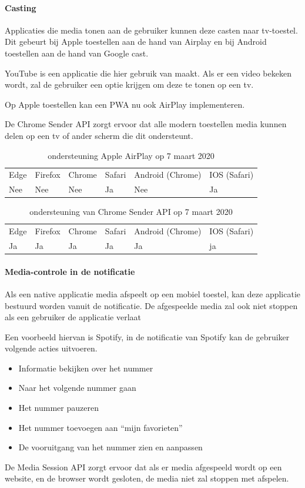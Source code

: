 \paragraph{Casting}

Applicaties die media tonen aan de gebruiker kunnen deze casten naar tv-toestel. Dit gebeurt bij Apple toestellen aan de hand van Airplay en bij Android toestellen aan de hand van Google cast.


YouTube is een applicatie die hier gebruik van maakt. Als er een video bekeken wordt, zal de gebruiker een optie krijgen om deze te tonen op een tv.


Op Apple toestellen kan een PWA nu ook AirPlay implementeren. 
\autocite{Apple2020a}


De Chrome Sender API \autocite{Developers2020b} zorgt ervoor dat alle modern toestellen media kunnen delen op een tv of ander scherm die dit ondersteunt.

\begin{table}[H]
	\centering
	\begin{tabular}{llllll}
		Edge & Firefox & Chrome & Safari & Android (Chrome) & IOS (Safari) \\
		Nee   & Nee      & Nee     & Ja     & Nee               & Ja          
	\end{tabular}	
	\caption{ondersteuning Apple AirPlay op 7 maart 2020}
\end{table}
\begin{table}[H]
	\centering
	\begin{tabular}{llllll}
		Edge & Firefox & Chrome & Safari & Android (Chrome) & IOS (Safari) \\
		Ja   & Ja      & Ja     & Ja     & Ja               & ja          
	\end{tabular}	
	\caption{ondersteuning van Chrome Sender API op 7 maart 2020}
\end{table}




\paragraph{Media-controle in de notificatie }


Als een native applicatie media afspeelt op een mobiel toestel, kan deze applicatie bestuurd worden vanuit de notificatie. De afgespeelde media zal ook niet stoppen als een gebruiker de applicatie verlaat

Een voorbeeld hiervan is Spotify, in de notificatie van Spotify kan de gebruiker volgende acties uitvoeren.
 \begin{itemize}
   \item	Informatie bekijken over het nummer
   \item	Naar het volgende nummer gaan
   \item	Het nummer pauzeren
   \item	Het nummer toevoegen aan “mijn favorieten”
   \item	De vooruitgang van het nummer zien en aanpassen
\end{itemize}
De Media Session API \autocite{Beaufort2019} zorgt ervoor dat als er media afgespeeld wordt op een website, en de browser wordt gesloten, de media niet zal stoppen met afspelen.

